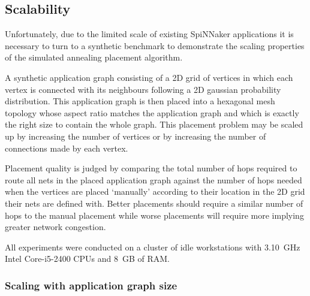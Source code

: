 		\subsection{Scalability}
			
			Unfortunately, due to the limited scale of existing SpiNNaker
			applications it is necessary to turn to a synthetic benchmark to
			demonstrate the scaling properties of the simulated annealing placement
			algorithm.
			
			A synthetic application graph consisting of a 2D grid of vertices in
			which each vertex is connected with its neighbours following a 2D
			gaussian probability distribution. This application graph is then placed
			into a hexagonal mesh topology whose aspect ratio matches the application
			graph and which is exactly the right size to contain the whole graph.
			This placement problem may be scaled up by increasing the number of
			vertices or by increasing the number of connections made by each vertex.
			
			Placement quality is judged by comparing the total number of hops
			required to route all nets in the placed application graph against the
			number of hops needed when the vertices are placed `manually' according
			to their location in the 2D grid their nets are defined with. Better
			placements should require a similar number of hops to the manual
			placement while worse placements will require more implying greater
			network congestion.
			
			All experiments were conducted on a cluster of idle workstations with
			3.10~GHz Intel Core-i5-2400 CPUs and 8~GB of RAM.
			
			\subsubsection{Scaling with application graph size}
				
